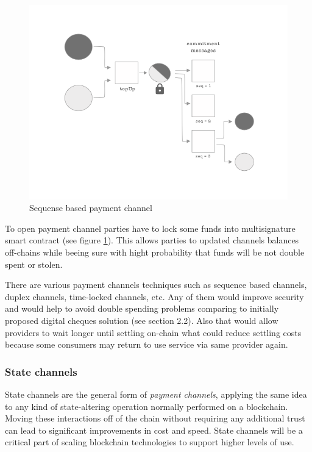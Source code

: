 \documentclass[a4paper,12pt]{article}
\begin{document}
\begin{figure}[H]
    \centering
    \includegraphics[scale=0.5]{../img/payment-channel}
    \caption{Sequense based payment channel}
    \label{img:payment-channel}
\end{figure}

To open payment channel parties have to lock some funds into multisignature 
smart contract (see figure \ref{img:payment-channel}). This allows parties to
updated channels balances off-chains while beeing sure with hight probability 
that funds will be not double spent or stolen.

There are various payment channels techniques such as sequence based channels, 
duplex channels, time-locked channels, etc. Any of them would improve security 
and would help to avoid double spending problems comparing to initially proposed
digital cheques solution (see section 2.2). Also that would allow providers to
wait longer until settling on-chain what could reduce settling costs because 
some consumers may return to use service via same provider again. \\

\subsubsection{State channels}

State channels are the general form of \textit{payment channels}, applying the
same idea to any kind of state-altering operation normally performed on a 
blockchain. Moving these interactions off of the chain without requiring any 
additional trust can lead to significant improvements in cost and speed. State 
channels will be a critical part of scaling blockchain technologies to support 
higher levels of use.
\end{document}
